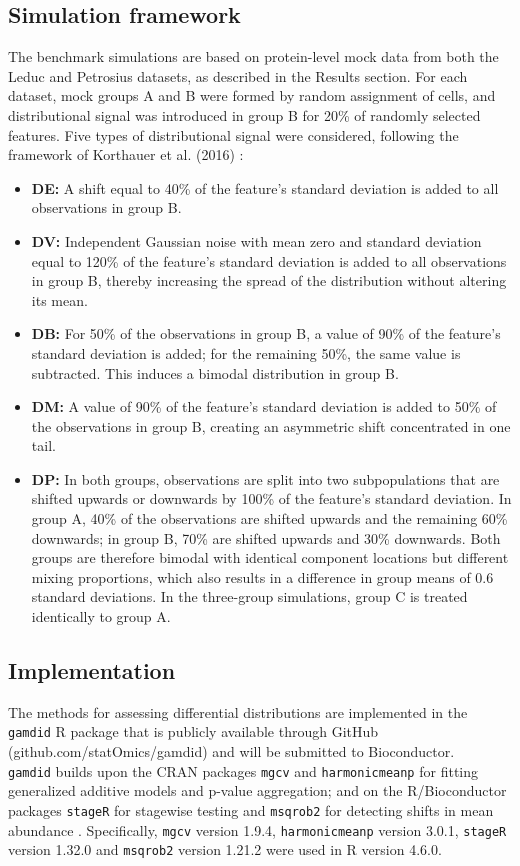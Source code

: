 \subsection{Simulation framework}
The benchmark simulations are based on protein-level mock data from both the Leduc and Petrosius datasets, as described in the Results section. For each dataset, mock groups A and B were formed by random assignment of cells, and distributional signal was introduced in group B for 20\% of randomly selected features. Five types of distributional signal were considered, following the framework of Korthauer et al. (2016) \cite{scdd}:
\begin{itemize}
    \item \textbf{DE:} A shift equal to 40\% of the feature's standard deviation is added to all observations in group B.
    \item \textbf{DV:} Independent Gaussian noise with mean zero and standard deviation equal to 120\% of the feature's standard deviation is added to all observations in group B, thereby increasing the spread of the distribution without altering its mean.
    \item \textbf{DB:} For 50\% of the observations in group B, a value of 90\% of the feature's standard deviation is added; for the remaining 50\%, the same value is subtracted. This induces a bimodal distribution in group B.
    \item \textbf{DM:} A value of 90\% of the feature's standard deviation is added to 50\% of the observations in group B, creating an asymmetric shift concentrated in one tail.
    \item \textbf{DP:} In both groups, observations are split into two subpopulations that are shifted upwards or downwards by 100\% of the feature's standard deviation. In group A, 40\% of the observations are shifted upwards and the remaining 60\% downwards; in group B, 70\% are shifted upwards and 30\% downwards. Both groups are therefore bimodal with identical component locations but different mixing proportions, which also results in a difference in group means of 0.6 standard deviations. In the three-group simulations, group C is treated identically to group A.
\end{itemize}


\subsection{Implementation}
The methods for assessing differential distributions are implemented in the \texttt{gamdid} R package that is publicly available through GitHub (github.com/statOmics/gamdid) and will be submitted to Bioconductor.\\
\texttt{gamdid} builds upon the CRAN packages \texttt{mgcv} \cite{mgcv} and \texttt{harmonicmeanp} \cite{hmp_package} for fitting generalized additive models and p-value aggregation; and on the R/Bioconductor packages \texttt{stageR} \cite{stager} for stagewise testing and \texttt{msqrob2} for detecting shifts in mean abundance \cite{msqrob}. Specifically, \texttt{mgcv} version 1.9.4, \texttt{harmonicmeanp} version 3.0.1, \texttt{stageR} version 1.32.0 and \texttt{msqrob2} version 1.21.2 were used in R version 4.6.0.
